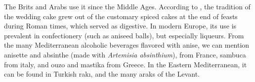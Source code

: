 The Brits and Arabs use it since the Middle Ages. According to \textcite{wilson_wedding_2005}, 
the tradition of the wedding cake grew out of the customary spiced cakes at the end of feasts during Roman times, which served as digestive. In modern Europe, its use is prevalent in confectionery (such as aniseed balls), but especially liqueurs. From the many Mediterranean alcoholic beverages flavored with anise, we can mention anisette and absinthe (made with \textit{Artemisia absinthium}), from France, sambuca from italy, and ouzo and mastika from Greece. 
In the Eastern Mediterranean, it can be found in Turkish rakı, and the many araks of the Levant.





